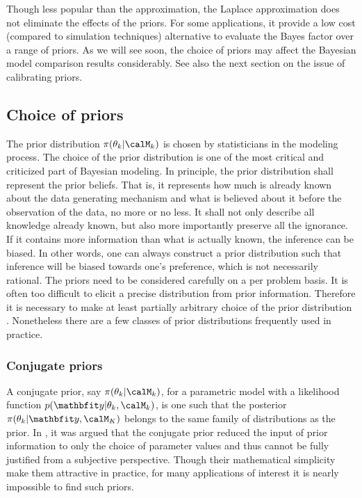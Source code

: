 Though less popular than the \bic approximation, the Laplace approximation
does not eliminate the effects of the priors. For some applications, it
provide a low cost (compared to simulation techniques) alternative to evaluate
the Bayes factor over a range of priors. As we will see soon, the choice of
priors may affect the Bayesian model comparison results considerably. See also
the next section on the issue of calibrating priors.

\subsection{Choice of priors}
\label{sub:Choice of priors}

The prior distribution $\pi(\theta_k|\calM_k)$ is chosen by statisticians in
the modeling process. The choice of the prior distribution is one of the most
critical and criticized part of Bayesian modeling. In principle, the prior
distribution shall represent the prior beliefs. That is, it represents how
much is already known about the data generating mechanism and what is believed
about it before the observation of the data, no more or no less. It shall not
only describe all knowledge already known, but also more importantly preserve
all the ignorance. If it contains more information than what is actually
known, the inference can be biased. In other words, one can always construct a
prior distribution such that inference will be biased towards one's
preference, which is not necessarily rational. The priors need to be
considered carefully on a per problem basis. It is often too difficult to
elicit a precise distribution from prior information. Therefore it is
necessary to make at least partially arbitrary choice of the prior
distribution \cite[][chap.~3]{Robert:2007tc}\cite{Kass:1995vb}. Nonetheless
there are a few classes of prior distributions frequently used in practice.

\subsubsection{Conjugate priors}
\label{ssub:Conjugate priors}

A conjugate prior, say $\pi(\theta_k|\calM_k)$, for a parametric model with a
likelihood function $p(\data|\theta_k,\calM_k)$, is one such that the
posterior $\pi(\theta_k|\data,\calM_K)$ belongs to the same family of
distributions as the prior. In \cite[][sec.~5.2]{Bernardo:1994vd}, it was
argued that the conjugate prior reduced the input of prior information to only
the choice of parameter values and thus cannot be fully justified from a
subjective perspective. Though their mathematical simplicity make them
attractive in practice, for many applications of interest it is nearly
impossible to find such priors.

